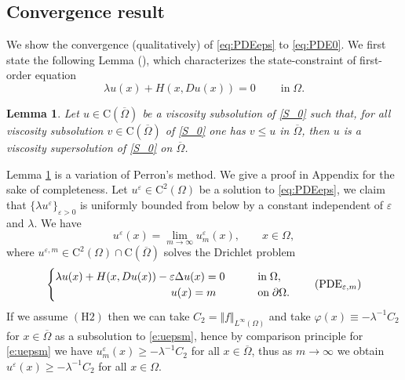 \documentclass[11pt,reqno]{amsart}
\numberwithin{figure}{section}
\theoremstyle{plain}
\newtheorem{lem}[thm]{Lemma}
\theoremstyle{remark}
\numberwithin{equation}{section}
\newcommand{\rmC}{\mathrm{C}}
\begin{document}
\subsection{Convergence result} We show the convergence (qualitatively) of \eqref{eq:PDEeps} to \eqref{eq:PDE0}. We first state the following Lemma (\cite{Capuzzo-Dolcetta1990}), which characterizes the state-constraint of first-order equation
\begin{equation}\label{S_0}
 \lambda u(x) + H(x,Du(x)) = 0\;\qquad\text{in}\;\Omega. \tag{$S_0$}
\end{equation}

\begin{lem}\label{lem:max} Let $u\in \rmC(\overline{\Omega})$ be a viscosity subsolution of \eqref{S_0} such that, for all viscosity subsolution $v\in \rmC(\overline{\Omega})$ of \eqref{S_0} one has $v\leq u$ in $\overline{\Omega}$, then $u$ is a viscosity supersolution of \eqref{S_0} on $\overline{\Omega}$.
\end{lem}
\noindent Lemma \ref{lem:max} is a variation of Perron's method. We give a proof in Appendix for the sake of completeness. Let $u^\varepsilon\in \mathrm{C}^2(\Omega)$ be a solution to \eqref{eq:PDEeps}, we claim that $\{\lambda u^\varepsilon\}_{\varepsilon>0}$ is uniformly bounded from below by a constant independent of $\varepsilon$ and $\lambda$. We have
\begin{equation*}
    u^\varepsilon(x) = \lim_{m\to \infty} u^{\varepsilon}_m(x), \qquad x\in \Omega,
\end{equation*}
 where $u^{\varepsilon,m}\in \mathrm{C}^2(\Omega)\cap \rmC(\overline{\Omega})$ solves the Drichlet problem
\begin{equation}\label{e:uepsm}
    \begin{cases}
    \lambda u(x) + H(x,Du(x)) - \varepsilon \Delta u(x) = 0 &\qquad
    \text{in}\;\Omega, \vspace{0cm}\\
    \;\;\quad\quad\qquad\qquad\qquad\qquad u(x) = m &\qquad
    \text{on}\;\partial\Omega.
    \end{cases} \tag{PDE$_{\varepsilon,m}$}
\end{equation}
If we assume $\mathrm{(H2)}$ then we can take $C_2 = \Vert f\Vert_{L^\infty(\Omega)}$ and take $\varphi(x) \equiv -\lambda^{-1}C_2$ for $x\in \overline{\Omega}$ as a subsolution to \eqref{e:uepsm}, hence by comparison principle for \eqref{e:uepsm} we have $u^{\varepsilon}_m(x)\geq -\lambda^{-1}C_2$ for all $x\in \overline{\Omega}$, thus as $m\to \infty$ we obtain $u^\varepsilon(x) \geq -\lambda^{-1}C_2$ for all $x\in \Omega$.
\end{document}
